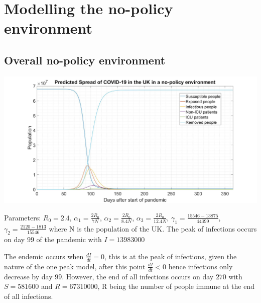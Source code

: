 \documentclass[11pt]{article}
\begin{document}
\section{Modelling the no-policy environment}
\subsection{Overall no-policy environment}
\begin{center}
\includegraphics[width=1\textwidth]{No-policySEIHR.jpg} 
\end{center}
Parameters: $R_0=2.4$, $\alpha_1=\frac{2R_0}{7N}$, $\alpha_2=\frac{2R_0}{8.4N}$, $\alpha_3=\frac{2R_0}{12.4N}$, $\gamma_1=\frac{15546-13875}{44399}$, $\gamma_2=\frac{2120-1813}{15546}$ where N is the population of the UK. The peak of infections occurs on day $99$ of the pandemic with $I=13983000$ \par
The endemic occurs when $\frac{dI}{dt}=0$, this is at the peak of infections, given the nature of the one peak model, after this point $\frac{dI}{dt}<0$ hence infections only decrease by day $99$. However, the end of all infections occurs on day $270$ with $S=581600$ and $R=67310000$, R being the number of people immune at the end of all infections.
\end{document}
